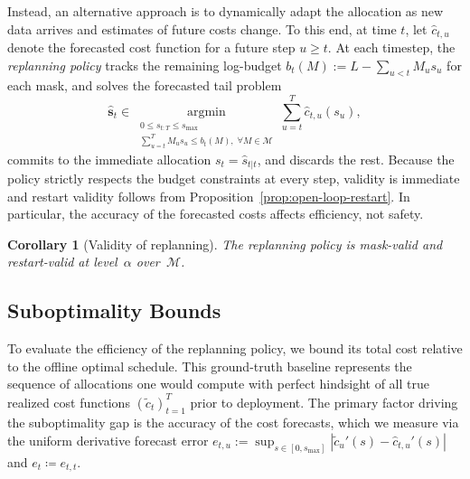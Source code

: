 \documentclass{uai2026} %
\newtheorem{corollary}[theorem]{Corollary}
\newcommand{\1}{\mathbf{1}}
\newcommand{\eqdef}{\coloneqq}
\newcommand{\G}{\mathcal{G}}
\newcommand{\mcal}{\mathcal{M}}
\newcommand{\argmin}{\operatorname*{argmin}}
\begin{document}
Instead, an alternative approach is to dynamically adapt the allocation as new data arrives and estimates of future costs change. To this end, at time $t$, let $\hat{c}_{t,u}$ denote the forecasted cost function for a future step $u \ge t$.
At each timestep, the \emph{replanning policy} tracks the remaining log-budget $b_t(M) := L - \sum_{u < t} M_u s_u$ for each mask, and solves the forecasted tail problem
\begin{equation}
  \label{eq:replan-action}
  \hat{\bm{s}}_t \in \argmin_{\substack{0 \le s_{t:T} \le s_{\max}\\
  \sum_{u=t}^{T} M_u s_u \le b_t(M),\; \forall M \in \mcal}}
  \sum_{u=t}^{T} \hat{c}_{t,u}(s_u),
\end{equation}
commits to the immediate allocation $s_t = \hat{s}_{t|t}$, and discards the rest.
Because the policy strictly respects the budget constraints at every step, validity is immediate and restart validity follows from Proposition~\ref{prop:open-loop-restart}. In particular, the accuracy of the forecasted costs affects efficiency, not safety.

\begin{corollary}[Validity of replanning]
  \label{cor:replan-validity}
  The replanning policy is mask-valid and restart-valid at level~$\alpha$ over~$\mcal$.
\end{corollary}
%

\subsection{Suboptimality Bounds}
\label{sec:suboptimality}

To evaluate the efficiency of the replanning policy, we bound its total cost relative to the offline optimal schedule. This ground-truth baseline represents the sequence of allocations one would compute with perfect hindsight of all true realized cost functions $(\tilde{c}_t)_{t=1}^T$ prior to deployment.
The primary factor driving the suboptimality gap is the accuracy of the cost forecasts, which we measure via the uniform derivative forecast error $e_{t,u} := \sup_{s \in [0,s_{\max}]} |\tilde{c}_u'(s) - \hat{c}_{t,u}'(s)|$ and $e_{t}\eqdef e_{t,t}$.
\end{document}
